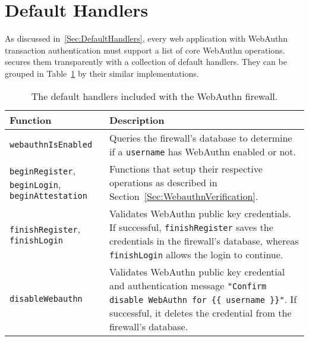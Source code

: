 \section{Default Handlers}

As discussed in~\ref{Sec:DefaultHandlers}, every web application with WebAuthn transaction authentication must support a list of core WebAuthn operations. \sys{} secures them transparently with a collection of default handlers. They can be grouped in Table~\ref{Table:Implementation_DefaultHandlers} by their similar implementations.


\begin{table}[h]
\centering

\begin{tabular}{ m{3cm} m{11cm}  } 
 \hline
 Function & Description \\ 
 \hline \hline

 \lstinline|webauthnIsEnabled| & Queries the firewall's database to determine if a \lstinline|username| has WebAuthn enabled or not. \\ \hline

 \lstinline|beginRegister|, \lstinline|beginLogin|, \lstinline|beginAttestation| & Functions that setup their respective operations as described in Section~\ref{Sec:WebauthnVerification}. \\ \hline

 \lstinline|finishRegister|, \lstinline|finishLogin| & Validates WebAuthn public key credentials. If successful, \lstinline|finishRegister| saves the credentials in the firewall's database, whereas \lstinline|finishLogin| allows the login to continue. \\ \hline

 \lstinline|disableWebauthn| & Validates WebAuthn public key credential and authentication message \lstinline|"Confirm disable WebAuthn for {{ username }}"|. If successful, it deletes the credential from the firewall's database. \\ \hline

\end{tabular}
\caption{The default handlers included with the WebAuthn firewall.}
\label{Table:Implementation_DefaultHandlers}
\end{table}

